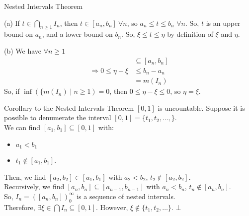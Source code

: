 \documentclass[8pt]{extarticle}
\begin{document}
\begin{problem}{Nested Intervals Theorem}
\begin{problem}{(a)}
      If $t\in \bigcap_{n\geq 1}I_n$, then $t\in [a_n,b_n]~\forall n$, so $a_n \leq t \leq b_n$ $\forall n$. So, $t$ is an upper bound on $a_n$, and a lower bound on $b_n$. So, $\xi \leq t \leq \eta$ by definition of $\xi$ and $\eta$.
    \end{problem}
    \begin{problem}{(b)}
      We have $\forall n\geq 1$
      \begin{align*}
        [\xi,\eta] &\subseteq [a_n,b_n]\\
        \Rightarrow 0 \leq \eta-\xi &\leq b_n-a_n\\
                                    &= m(I_n)
      \end{align*}
      So, if $\inf\left(\{m(I_n)\mid n\geq 1\right) = 0$, then $0\leq \eta-\xi \leq 0$, so $\eta = \xi$.
    \end{problem}
  \end{problem}
  \begin{problem}{Corollary to the Nested Intervals Theorem}
    $[0,1]$ is uncountable.
    \tcblower
    Suppose it is possible to denumerate the interval $[0,1] = \{t_1,t_2,\dots,\}$.\\

    We can find $[a_1,b_1]\subseteq [0,1]$ with:
    \begin{itemize}
      \item $a_1 < b_1$
      \item $t_1\notin [a_1,b_1]$.
    \end{itemize}
    Then, we find $[a_2,b_2]\in [a_1,b_1]$ with $a_2 < b_2$, $t_2\notin [a_2,b_2]$.\\

    Recursively, we find $[a_n,b_n]\subseteq [a_{n-1},b_{n-1}]$ with $a_n < b_n$, $t_n\notin [a_n,b_n]$.\\

    So, $I_n = ([a_n,b_n])_{0}^{\infty}$ is a sequence of nested intervals.\\

    Therefore, $\exists \xi\in \bigcap I_n \subseteq [0,1]$. However, $\xi \notin \{t_1,t_2,\dots\}$. $\bot$
  \end{problem}
\end{document}
